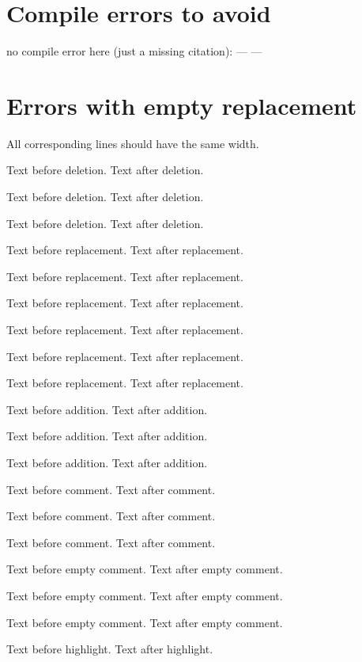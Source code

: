\documentclass[11pt, a4paper, notitlepage, english]{article}
\begin{document}
\section{Compile errors to avoid}

no compile error here (just a missing citation): ---  ---

\section{Errors with empty replacement}

All corresponding lines should have the same width.

Text before deletion.
Text after deletion.

Text before deletion.  Text after deletion.

Text before deletion.
Text after deletion.

Text before replacement.
Text after replacement.

Text before replacement.  Text after replacement.

Text before replacement.
Text after replacement.

Text before replacement.
\replaced{}{}
Text after replacement.

Text before replacement. \replaced{}{} Text after replacement.

Text before replacement.
Text after replacement.

Text before addition.
\added{}
Text after addition.

Text before addition. \added{} Text after addition.

Text before addition.
Text after addition.

Text before comment.
Text after comment.

Text before comment.  Text after comment.

Text before comment.
Text after comment.

Text before empty comment.
\comment{}
Text after empty comment.

Text before empty comment. \comment{} Text after empty comment.

Text before empty comment.
Text after empty comment.

Text before highlight.
Text after highlight.
\end{document}
